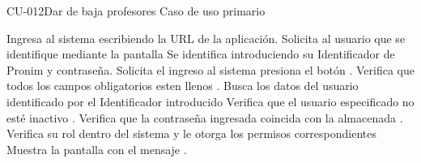 \begin{UseCase}{CU-012}{Dar de baja profesores}
{		%
		Caso de uso primario
	}
\end{UseCase}

\begin{UCtrayectoria}
	
	\UCpaso[\UCactor] Ingresa al sistema escribiendo la URL de la aplicación.
	\UCpaso Solicita al usuario que se identifique mediante la pantalla 
	\UCpaso[\UCactor] \label{UC1.Datos} Se identifica introduciendo su Identificador de Pronim y contraseña.
	\UCpaso[\UCactor] Solicita el ingreso al sistema presiona el botón .
    \UCpaso Verifica que todos los campos obligatorios esten llenos .
	\UCpaso Busca los datos del usuario identificado por el Identificador introducido 
	\UCpaso Verifica que el usuario especificado no esté inactivo .
	\UCpaso Verifica que la contraseña ingresada coincida con la almacenada .\label{UC1.Contrasenia}
	\UCpaso Verifica su rol dentro del sistema y le otorga los permisos correspondientes
	\UCpaso Muestra la pantalla  con el mensaje .
\end{UCtrayectoria}


